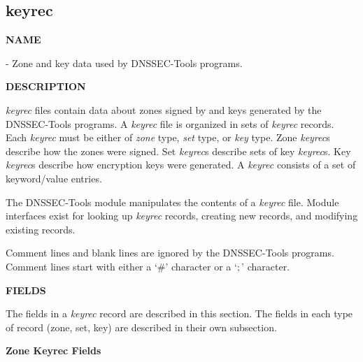 \clearpage

\subsection{\bf keyrec}

{\bf NAME}

 - Zone and key data used by DNSSEC-Tools programs.

{\bf DESCRIPTION}

{\it keyrec} files contain data about zones signed by and keys generated by
the DNSSEC-Tools programs.  A {\it keyrec} file is organized in sets of
{\it keyrec} records.  Each {\it keyrec} must be either of {\it zone} type,
{\it set} type, or {\it key} type.
Zone {\it keyrec}s describe how the zones were signed.
Set {\it keyrec}s describe sets of key {\it keyrec}s.
Key {\it keyrec}s describe how encryption keys were generated.
A {\it keyrec} consists of a set of keyword/value entries.

The DNSSEC-Tools  module manipulates the contents of a
{\it keyrec} file.  Module interfaces exist for looking up {\it keyrec}
records, creating new records, and modifying existing records.

Comment lines and blank lines are ignored by the DNSSEC-Tools programs.
Comment lines start with either a `\#' character or a `$;$' character.

{\bf FIELDS}

The fields in a {\it keyrec} record are described in this section.  The fields
in each type of record (zone, set, key) are described in their own subsection.

{\bf Zone Keyrec Fields}

